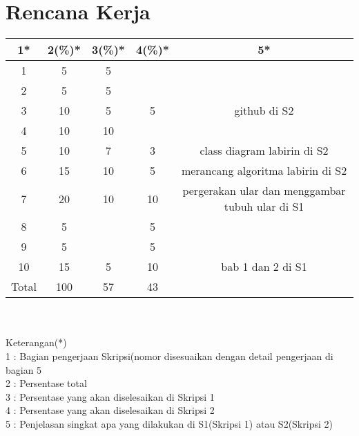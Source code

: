 \documentclass[11pt]{article}
\begin{document}
\section{Rencana Kerja}
\begin{tabular}{|c|c|c|c|c|}
			\hline
			1*&2(\%)*&3(\%)*&4(\%)*&5*\\
			\hline
			1&5&5&& \\
			\hline
			2&5&5&&\\
			\hline
			3&10&5&5&github di S2 \\ 
			\hline
			4&10&10&& \\
			\hline
			5&10&7&3&class diagram labirin di S2\\
			\hline
			6&15&10&5&merancang algoritma labirin di S2\\ 
			\hline
			7&20&10&10&pergerakan ular dan menggambar tubuh ular di S1\\
			\hline
			8&5&&5&\\
			\hline
			9&5&&5&\\
			\hline
			10&15&5&10&bab 1 dan 2 di S1\\
			\hline
			Total&100&57&43& \\
			\hline
\end{tabular}
\\\\
Keterangan(*)\\
1 : Bagian pengerjaan Skripsi(nomor disesuaikan dengan detail pengerjaan di bagian 5 \\
2 : Persentase total\\
3 : Persentase yang akan diselesaikan di Skripsi 1\\
4 : Persentase yang akan diselesaikan di Skripsi 2\\
5 : Penjelasan singkat apa yang dilakukan di S1(Skripsi 1) atau S2(Skripsi 2)\\
\end{document}
